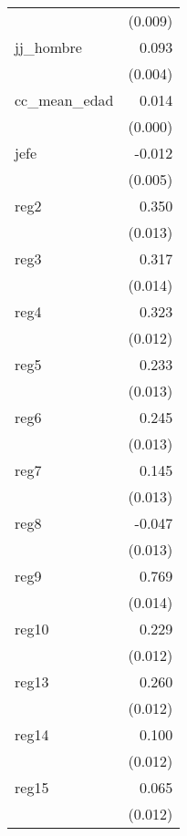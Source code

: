 {\begin{longtable}{l*{1}{D{.}{.}{-1}}}
            &     (0.009)         \\
\addlinespace
jj\_hombre   &       0.093\sym{***}\\
            &     (0.004)         \\
\addlinespace
cc\_mean\_edad&       0.014\sym{***}\\
            &     (0.000)         \\
\addlinespace
jefe        &      -0.012\sym{*}  \\
            &     (0.005)         \\
\addlinespace
reg2        &       0.350\sym{***}\\
            &     (0.013)         \\
\addlinespace
reg3        &       0.317\sym{***}\\
            &     (0.014)         \\
\addlinespace
reg4        &       0.323\sym{***}\\
            &     (0.012)         \\
\addlinespace
reg5        &       0.233\sym{***}\\
            &     (0.013)         \\
\addlinespace
reg6        &       0.245\sym{***}\\
            &     (0.013)         \\
\addlinespace
reg7        &       0.145\sym{***}\\
            &     (0.013)         \\
\addlinespace
reg8        &      -0.047\sym{***}\\
            &     (0.013)         \\
\addlinespace
reg9        &       0.769\sym{***}\\
            &     (0.014)         \\
\addlinespace
reg10       &       0.229\sym{***}\\
            &     (0.012)         \\
\addlinespace
reg13       &       0.260\sym{***}\\
            &     (0.012)         \\
\addlinespace
reg14       &       0.100\sym{***}\\
            &     (0.012)         \\
\addlinespace
reg15       &       0.065\sym{***}\\
            &     (0.012)         \\

\end{longtable}}
